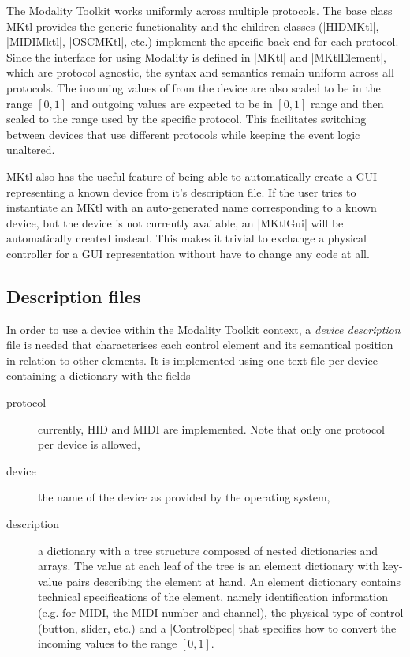 \documentclass{article}
\begin{document}
The Modality Toolkit works uniformly across multiple protocols. The base class MKtl provides the generic functionality and the children classes (|HIDMKtl|, |MIDIMktl|, |OSCMKtl|, etc.) implement the specific back-end for each protocol. Since the interface for using Modality is defined in |MKtl| and |MKtlElement|, which are protocol agnostic, the syntax and semantics remain uniform across all protocols. The incoming values of from the device are also scaled to be in the range $[0,1]$ and outgoing values are expected to be in $[0,1]$ range and then scaled to the range used by the specific protocol. This facilitates switching between devices that use different protocols while keeping the event logic unaltered.

MKtl also has the useful feature of being able to automatically create a GUI representing a known device from it's description file. If the user tries to instantiate an MKtl with an auto-generated name corresponding to a known device, but the device is not currently available, an |MKtlGui| will be automatically created instead. This makes it trivial to exchange a physical controller for a GUI representation without have to change any code at all.

\subsection{Description files}
\label{sub:descriptions_files}

In order to use a device within the Modality Toolkit context, a \textit{device description} file is needed that characterises each control element and its semantical position in relation to other elements.
It is implemented using one text file per device containing a dictionary with the fields 
\begin{description}
	\item[protocol] currently, HID and MIDI are implemented. Note that only one protocol per device is allowed,
	\item[device] the name of the device as provided by the operating system,
	\item[description] a dictionary with a tree structure composed of nested dictionaries and arrays. The value at each leaf of the tree is an element dictionary with key-value pairs describing the element at hand.
	An element dictionary contains technical specifications of the element, namely identification information (e.g. for MIDI, the MIDI number and channel), the physical type of control (button, slider, etc.) and a |ControlSpec| that specifies how to convert the incoming values to the range $[0,1]$.
\end{description}
\end{document}
